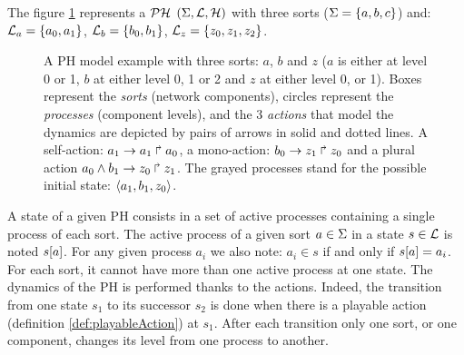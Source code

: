 \begin{example}
The figure \ref{fig:ph} represents a $\mathcal{PH}$ $(\Sigma,\mathcal{L},\mathcal{H})$ with three sorts
($\Sigma = \{a, b, c\}$) and:
$\mathcal{L}_a = \{a_0, a_1\}$,
$\mathcal{L}_b = \{b_0, b_1\}$,
$\mathcal{L}_z = \{z_0, z_1, z_2\}$.
\begin{figure}[ht]
\label{fig:ph} 
\centering
{}
\caption{
A PH model example with three sorts: $a$, $b$ and $z$ ($a$ is either at level 0 or 1, $b$ at either level 0, 1 or 2 and $z$ at either level 0, or 1). Boxes represent the \emph{sorts} (network components), circles represent the \emph{processes} (component levels), and the 3 \emph{actions} that model the dynamics are depicted by pairs of arrows in solid and dotted lines. A self-action:  $a_1\rightarrow a_1\Rsh a_0$, a mono-action:  $b_0\rightarrow z_1\Rsh z_0$ and a plural action  $a_0 \wedge b_1\rightarrow z_0\Rsh z_1$.  The grayed processes stand for the possible initial state: $\mbox{$\langle a_1, b_1, z_0 \rangle$}$.
}
\end{figure}
\end{example}
A state of a given PH consists in a set of active processes containing a single process of each sort.
The active process of a given sort $a \in \Sigma$ in a state $s \in \mathcal{L}$
is noted ${s[a]}$.
For any given process $a_i$ we also note: $a_i \in s$ if and only if ${s[a]} = a_i$. For each sort, it cannot have more than one active process at one state. The dynamics of the PH is performed thanks to the actions. Indeed, the transition from one state $s_1$ to its successor $s_2$ is done when there is a playable action (definition \ref{def:playableAction}) at $s_1$. After each transition only one sort, or one component, changes its level from one process to another.
%

